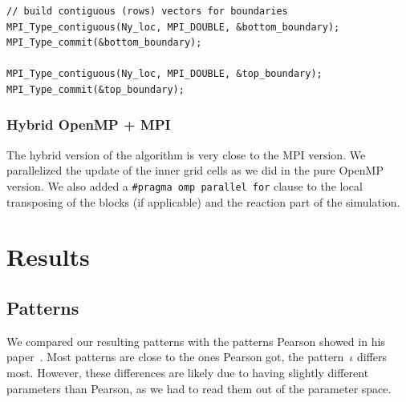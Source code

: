\documentclass[a4paper]{article}
\begin{document}
\begin{lstlisting}[label={lst:datatypes-ghost}, caption={MPI data types for ghost cells}, float]
// build contiguous (rows) vectors for boundaries
MPI_Type_contiguous(Ny_loc, MPI_DOUBLE, &bottom_boundary);
MPI_Type_commit(&bottom_boundary);

MPI_Type_contiguous(Ny_loc, MPI_DOUBLE, &top_boundary);
MPI_Type_commit(&top_boundary);
\end{lstlisting}






\subsubsection{Hybrid OpenMP + MPI}
The hybrid version of the algorithm is very close to the MPI version.
We parallelized the update of the inner grid cells as we did in the pure OpenMP version.
We also added a \verb+#pragma omp parallel for+ clause to the local transposing of the blocks (if applicable) and the reaction part of the simulation.


\section{Results}

\subsection{Patterns}
We compared our resulting patterns with the patterns Pearson showed in his paper~\cite{pearson_1993}.
Most patterns are close to the ones Pearson got, the pattern~$\iota$ differs most.
However, these differences are likely due to having slightly different parameters than Pearson, as we had to read them out of the parameter space.
\end{document}

